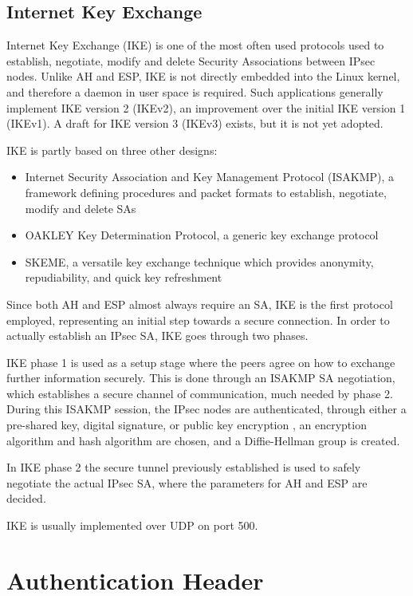 \documentclass[a4paper,12pt]{report}
\begin{document}
	
	\subsection{Internet Key Exchange}
		Internet Key Exchange (IKE) is one of the most often used protocols used to establish, negotiate, modify and delete Security Associations between IPsec nodes. Unlike AH and ESP, IKE is not directly embedded into the Linux kernel, and therefore a daemon in user space is required. Such applications generally implement IKE version 2 (IKEv2), an improvement over the initial IKE version 1 (IKEv1). A draft for IKE version 3 (IKEv3) exists, but it is not yet adopted.
		
		IKE is partly based on three other designs:
		\begin{itemize}
			\item Internet Security Association and Key Management Protocol (ISAKMP), a framework defining procedures and packet formats to establish, negotiate, modify and delete SAs
			\item OAKLEY Key Determination Protocol, a generic key exchange protocol
			\item SKEME, a versatile key exchange technique which provides anonymity, repudiability, and quick key refreshment
		\end{itemize}
		
		Since both AH and ESP almost always require an SA, IKE is the first protocol employed, representing an initial step towards a secure connection. In order to actually establish an IPsec SA, IKE goes through two phases. 
		
		IKE phase 1 is used as a setup stage where the peers agree on how to exchange further information securely. This is done through an ISAKMP SA negotiation, which establishes a secure channel of communication, much needed by phase 2. During this ISAKMP session, the IPsec nodes are authenticated, through either a pre-shared key, digital signature, or public key encryption \cite{rfc5996}, an encryption algorithm and hash algorithm are chosen, and a Diffie-Hellman group is created.
		
		In IKE phase 2 the secure tunnel previously established is used to safely negotiate the actual IPsec SA, where the parameters for AH and ESP are decided. 
		
		IKE is usually implemented over UDP on port 500.
		
		\section{Authentication Header}
\end{document}

